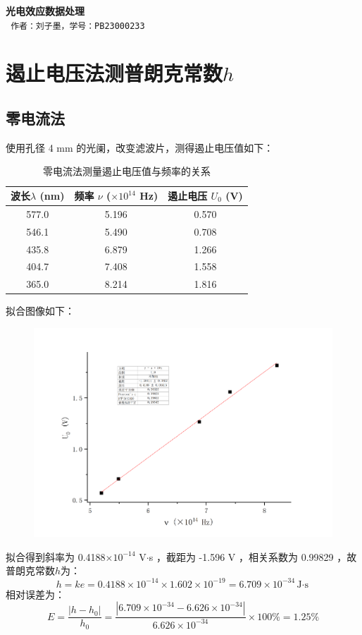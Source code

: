 \documentclass[a4paper]{extarticle}
\begin{document}
    \begin{center}
        \textbf{\fontsize{22pt}{\baselineskip} \selectfont 光电效应数据处理}\\
        \vspace{2em}
        \texttt{\fontsize{14pt}{\baselineskip} \selectfont 作者：刘子墨，学号：PB23000233}\\
    \end{center}
    \section{遏止电压法测普朗克常数$h$}
    \subsection{零电流法}
    使用孔径 4 mm 的光阑，改变滤波片，测得遏止电压值如下：
    \begin{table}[H]
        \centering
        \caption{零电流法测量遏止电压值与频率的关系}
        \begin{tabular}{ccc}
            \toprule
            波长$\lambda$ (nm) & 频率 $\nu$ ($\times10^{14}$ Hz) & 遏止电压 $U_0$ (V)\\
            \midrule
            577.0 & 5.196 & 0.570\\
            546.1 & 5.490 & 0.708\\
            435.8 & 6.879 & 1.266\\
            404.7 & 7.408 & 1.558\\
            365.0 & 8.214 & 1.816\\
            \bottomrule
        \end{tabular}
    \end{table}
    拟合图像如下：
    \begin{figure}[H]
        \centering
        \includegraphics[width=0.8\linewidth]{1.png}
    \end{figure}
    拟合得到斜率为 0.4188$\times10^{-14}$ V$\cdot$s ，截距为 -1.596 V ，相关系数为 0.99829 ，故普朗克常数$h$为：
    \begin{equation*}
        h = ke = 0.4188\times10^{-14} \times 1.602\times10^{-19} = 6.709\times10^{-34} \text{J$\cdot$s}
    \end{equation*}
    相对误差为：
    \begin{equation*}
        E = \frac{|h-h_0|}{h_0} = \frac{|6.709\times10^{-34} - 6.626\times10^{-34}|}{6.626\times10^{-34}} \times 100\% = 1.25\%
    \end{equation*}
\end{document}
